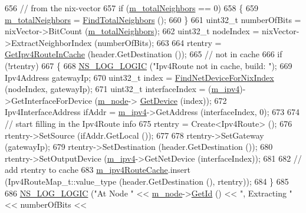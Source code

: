 \begin{DoxyCode}
656   \textcolor{comment}{// from the nix-vector}
657   \textcolor{keywordflow}{if} (\hyperlink{classns3_1_1Ipv4NixVectorRouting_a96620dedcc6c052265c3c53aa14e4f6b}{m\_totalNeighbors} == 0)
658     \{
659       \hyperlink{classns3_1_1Ipv4NixVectorRouting_a96620dedcc6c052265c3c53aa14e4f6b}{m\_totalNeighbors} = \hyperlink{classns3_1_1Ipv4NixVectorRouting_ae4d125bd51c2d70084543489f00060b5}{FindTotalNeighbors} ();
660     \}
661   uint32\_t numberOfBits = nixVector->BitCount (\hyperlink{classns3_1_1Ipv4NixVectorRouting_a96620dedcc6c052265c3c53aa14e4f6b}{m\_totalNeighbors});
662   uint32\_t nodeIndex = nixVector->ExtractNeighborIndex (numberOfBits);
663 
664   rtentry = \hyperlink{classns3_1_1Ipv4NixVectorRouting_a1d352caa92d6d91e6cb94ecc31be4411}{GetIpv4RouteInCache} (header.GetDestination ());
665   \textcolor{comment}{// not in cache}
666   \textcolor{keywordflow}{if} (!rtentry)
667     \{
668       \hyperlink{group__logging_ga88acd260151caf2db9c0fc84997f45ce}{NS\_LOG\_LOGIC} (\textcolor{stringliteral}{"Ipv4Route not in cache, build: "});
669       Ipv4Address gatewayIp;
670       uint32\_t index = \hyperlink{classns3_1_1Ipv4NixVectorRouting_abbd212141a650d5260455663d59c24c9}{FindNetDeviceForNixIndex} (nodeIndex, gatewayIp);
671       uint32\_t interfaceIndex = (\hyperlink{classns3_1_1Ipv4NixVectorRouting_a215cb71f30d85df9ec7176ca22620519}{m\_ipv4})->GetInterfaceForDevice (\hyperlink{classns3_1_1Ipv4NixVectorRouting_a329265b09f4d85bac6ec9bd0ec2daa92}{m\_node}->
      \hyperlink{classns3_1_1Node_a5918dfd24ef632efc9a83a5f6561c76e}{GetDevice} (index));
672       Ipv4InterfaceAddress ifAddr = \hyperlink{classns3_1_1Ipv4NixVectorRouting_a215cb71f30d85df9ec7176ca22620519}{m\_ipv4}->GetAddress (interfaceIndex, 0);
673 
674       \textcolor{comment}{// start filling in the Ipv4Route info}
675       rtentry = Create<Ipv4Route> ();
676       rtentry->SetSource (ifAddr.GetLocal ());
677 
678       rtentry->SetGateway (gatewayIp);
679       rtentry->SetDestination (header.GetDestination ());
680       rtentry->SetOutputDevice (\hyperlink{classns3_1_1Ipv4NixVectorRouting_a215cb71f30d85df9ec7176ca22620519}{m\_ipv4}->GetNetDevice (interfaceIndex));
681 
682       \textcolor{comment}{// add rtentry to cache}
683       \hyperlink{classns3_1_1Ipv4NixVectorRouting_aeb85361b66489c60851f72f1493fdee7}{m\_ipv4RouteCache}.insert (Ipv4RouteMap\_t::value\_type (header.GetDestination (), 
      rtentry));
684     \}
685 
686   \hyperlink{group__logging_ga88acd260151caf2db9c0fc84997f45ce}{NS\_LOG\_LOGIC} (\textcolor{stringliteral}{"At Node "} << \hyperlink{classns3_1_1Ipv4NixVectorRouting_a329265b09f4d85bac6ec9bd0ec2daa92}{m\_node}->\hyperlink{classns3_1_1Node_aaf49b64a843565ce3812326313b370ac}{GetId} () << \textcolor{stringliteral}{", Extracting "} << numberOfBits <<

\end{DoxyCode}
